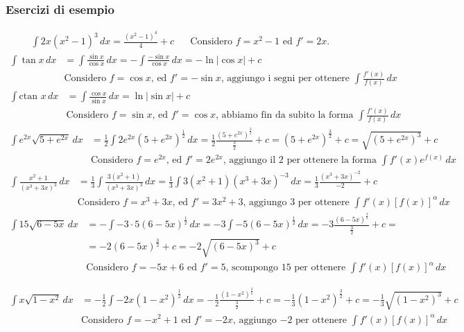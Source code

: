 \documentclass[11pt]{article}
\begin{document}
\subsubsection*{Esercizi di esempio}
\begin{align*}\int 2x(x^2-1)^3\,dx=\frac{(x^2-1)^4}{4}+c\,\,\,\,\,\,\,\,\,\,\text{Considero $f=x^2-1$ ed $f'=2x$.}\end{align*}
\begin{align*}\int \tan x\,dx&=\int \frac{\sin x}{\cos x}\,dx=-\int \frac{-\sin x}{\cos x}\,dx=-\ln | \cos x| +c\\&\text{Considero $f=\cos x$, ed $f'=-\sin x$, aggiungo i segni per ottenere $\int \frac{f'(x)}{f(x)}\,dx$}\end{align*}
\begin{align*}\int \text{ctan } x\,dx&=\int \frac{\cos x}{\sin x}\,dx=\ln | \sin x| +c\\&\text{Considero $f=\sin x$, ed $f'=\cos x$, abbiamo fin da subito la forma $\int \frac{f'(x)}{f(x)}\,dx$}\end{align*}
\begin{align*}\int e^{2x}\sqrt{5+e^{2x}}\,dx&=\frac{1}{2}\int 2e^{2x}(5+e^{2x})^{\frac{1}{2}}\,dx=\frac{1}{2}\frac{(5+e^{2x})^{\frac{3}{2}}}{\frac{3}{2}}+ c=(5+e^{2x})^{\frac{3}{2}}+c=\sqrt{\left(5+e^{2x}\right)^3}+c\\&\text{Considero $f=e^{2x}$, ed $f'=2e^{2x}$, aggiungo il $2$ per ottenere la forma $\int f'(x)e^{f(x)}\,dx$}\end{align*}
\begin{align*}\int \frac{x^2+1}{(x^3+3x)^3}\,dx&=\frac{1}{3}\int \frac{3(x^2+1)}{(x^3+3x)^3}\,dx=\frac{1}{3}\int 3(x^2+1) (x^3+3x)^{-3}\,dx=\frac{1}{3}\frac{(x^3+3x)^{-2}}{-2}+c\\&\text{Considero $f=x^3+3x$, ed $f'=3x^2+3$, aggiungo $3$ per ottenere $\int f'(x) [f(x)]^\alpha\,dx$}\end{align*}
\begin{align*}\int 15 \sqrt{6-5x}\,dx&=-\int -3 \cdot 5 (6-5x)^{\frac{1}{2}}\,dx=-3\int - 5 (6-5x)^{\frac{1}{2}}\,dx=-3 \frac{(6-5x)^{\frac{3}{2}}}{\frac{3}{2}}+c=\\&=-2(6-5x)^{\frac{3}{2}}+c=-2\sqrt{(6-5x)^3}+c\\&\text{Considero $f=-5x+6$ ed $f'=5$, scompongo $15$ per ottenere $\int f'(x) [f(x)]^\alpha\,dx$}\end{align*}

\begin{align*} \int x \sqrt{1-x^2}\,dx&=-\frac{1}{2}\int -2x(1-x^2)^{\frac{1}{2}}\,dx=-\frac{1}{2} \frac{(1-x^2)^{\frac{3}{2}}}{\frac{3}{2}}+c=-\frac{1}{3}(1-x^2)^{\frac{3}{2}}+c=-\frac{1}{3}\sqrt{(1-x^2)^3}+c\\&\text{Considero $f=-x^2+1$ ed $f'=-2x$, aggiungo $-2$ per ottenere $\int f'(x) [f(x)]^\alpha\,dx$}\end{align*}
\end{document}
